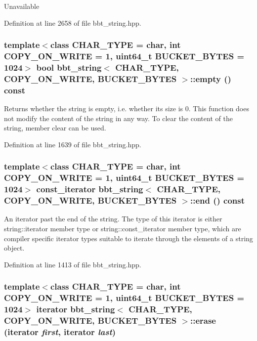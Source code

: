 Unavailable 

Definition at line 2658 of file bbt\_\-string.hpp.\hypertarget{classbbt__string_1a6fd2f8eaa83d6f9b33cc01f71af594}{
\subsubsection[{empty}]{\setlength{\rightskip}{0pt plus 5cm}template$<$class CHAR\_\-TYPE  = char, int COPY\_\-ON\_\-WRITE = 1, uint64\_\-t BUCKET\_\-BYTES = 1024$>$ bool {\bf bbt\_\-string}$<$ CHAR\_\-TYPE, COPY\_\-ON\_\-WRITE, BUCKET\_\-BYTES $>$::empty () const}}
\label{classbbt__string_1a6fd2f8eaa83d6f9b33cc01f71af594}


Returns whether the string is empty, i.e. whether its size is 0. This function does not modify the content of the string in any way. To clear the content of the string, member clear can be used. 

Definition at line 1639 of file bbt\_\-string.hpp.\hypertarget{classbbt__string_0ef119a4b2c850ae106876ab9d276977}{
\subsubsection[{end}]{\setlength{\rightskip}{0pt plus 5cm}template$<$class CHAR\_\-TYPE  = char, int COPY\_\-ON\_\-WRITE = 1, uint64\_\-t BUCKET\_\-BYTES = 1024$>$ const\_\-iterator {\bf bbt\_\-string}$<$ CHAR\_\-TYPE, COPY\_\-ON\_\-WRITE, BUCKET\_\-BYTES $>$::end () const}}
\label{classbbt__string_0ef119a4b2c850ae106876ab9d276977}


An iterator past the end of the string. The type of this iterator is either string::iterator member type or string::const\_\-iterator member type, which are compiler specific iterator types suitable to iterate through the elements of a string object. 

Definition at line 1413 of file bbt\_\-string.hpp.\hypertarget{classbbt__string_095d97e82bab15718a353ab0f9ec3a4f}{
\subsubsection[{erase}]{\setlength{\rightskip}{0pt plus 5cm}template$<$class CHAR\_\-TYPE  = char, int COPY\_\-ON\_\-WRITE = 1, uint64\_\-t BUCKET\_\-BYTES = 1024$>$ iterator {\bf bbt\_\-string}$<$ CHAR\_\-TYPE, COPY\_\-ON\_\-WRITE, BUCKET\_\-BYTES $>$::erase (iterator {\em first}, \/  iterator {\em last})}}
\label{classbbt__string_095d97e82bab15718a353ab0f9ec3a4f}



